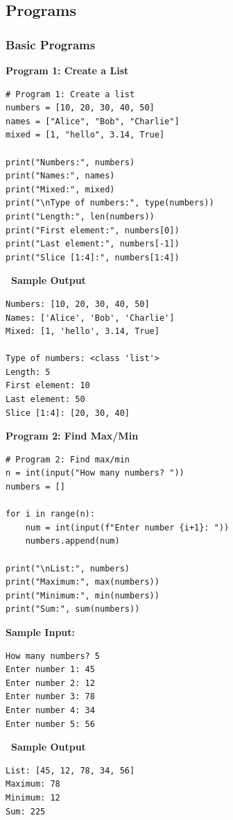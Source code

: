 \documentclass[12pt,a4paper]{article}
\newcommand{\outhead}{\noindent\colorbox{cmrgreen!25}%
  {\textbf{\small\color{cmrdark}~Sample Output~}}\par\vspace{-1pt}}
\begin{document}
\subsection{Programs}
\subsubsection{Basic Programs}

\textbf{Program 1: Create a List}

\begin{lstlisting}
# Program 1: Create a list
numbers = [10, 20, 30, 40, 50]
names = ["Alice", "Bob", "Charlie"]
mixed = [1, "hello", 3.14, True]

print("Numbers:", numbers)
print("Names:", names)
print("Mixed:", mixed)
print("\nType of numbers:", type(numbers))
print("Length:", len(numbers))
print("First element:", numbers[0])
print("Last element:", numbers[-1])
print("Slice [1:4]:", numbers[1:4])
\end{lstlisting}

\outhead
\begin{lstlisting}[style=outputstyle]
Numbers: [10, 20, 30, 40, 50]
Names: ['Alice', 'Bob', 'Charlie']
Mixed: [1, 'hello', 3.14, True]

Type of numbers: <class 'list'>
Length: 5
First element: 10
Last element: 50
Slice [1:4]: [20, 30, 40]
\end{lstlisting}

\vspace{0.5cm}

\textbf{Program 2: Find Max/Min}

\begin{lstlisting}
# Program 2: Find max/min
n = int(input("How many numbers? "))
numbers = []

for i in range(n):
    num = int(input(f"Enter number {i+1}: "))
    numbers.append(num)

print("\nList:", numbers)
print("Maximum:", max(numbers))
print("Minimum:", min(numbers))
print("Sum:", sum(numbers))
\end{lstlisting}

\textbf{Sample Input:}
\begin{verbatim}
How many numbers? 5
Enter number 1: 45
Enter number 2: 12
Enter number 3: 78
Enter number 4: 34
Enter number 5: 56
\end{verbatim}

\outhead
\begin{lstlisting}[style=outputstyle]
List: [45, 12, 78, 34, 56]
Maximum: 78
Minimum: 12
Sum: 225
\end{lstlisting}
\end{document}
